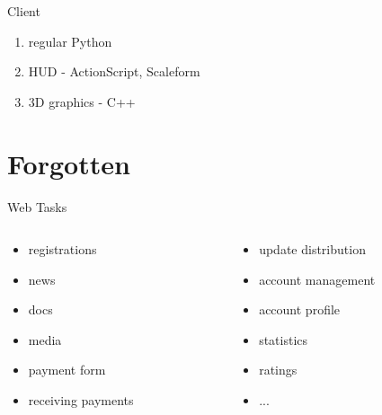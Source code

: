 \documentclass[aspectratio=169]{beamer}
\begin{document}
\begin{frame}{Client}
    \begin{enumerate}
        \item regular Python
        \item HUD - ActionScript, Scaleform
        \item 3D graphics - C++
    \end{enumerate}
\end{frame}


\section{Forgotten}
{
\begin{frame}[plain]{}
\end{frame}
}

\begin{frame}{Web Tasks}
    \begin{columns}
        \begin{column}{0.4\textwidth}
        \begin{itemize}
            \item registrations
            \item news
            \item docs
            \item media
            \item payment form
            \item receiving payments
        \end{itemize}
        \end{column}
    
        \begin{column}{0.4\textwidth}
        \begin{itemize}
            \item update distribution
            \item account management
            \item account profile
            \item statistics
            \item ratings
            \item ...
        \end{itemize}
        \end{column}
    \end{columns}
\end{frame}
\end{document}
